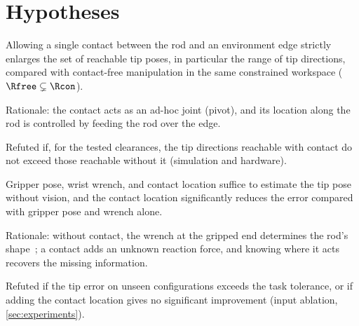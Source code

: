 \section{Hypotheses}
\label{sec:hypotheses}


\begin{hypothesis}[Reachability]\label{hyp:reach}
Allowing a single contact between the rod and an environment edge strictly
enlarges the set of reachable tip poses, in particular the range of tip
directions, compared with contact-free manipulation in the same constrained
workspace ($\Rfree\subsetneq\Rcon$).
\end{hypothesis}
\begin{outline}
  \item Rationale: the contact acts as an ad-hoc joint (pivot), and its
    location along the rod is controlled by feeding the rod over the edge.
  \item Refuted if, for the tested clearances, the tip directions reachable
    with contact do not exceed those reachable without it (simulation and
    hardware).
\end{outline}

\begin{hypothesis}\label{hyp:estimate}
Gripper pose, wrist wrench, and contact location suffice to estimate the tip
pose without vision, and the contact location significantly reduces the error
compared with gripper pose and wrench alone.
\end{hypothesis}
\begin{outline}
  \item Rationale: without contact, the wrench at the gripped end determines
    the rod's shape~\cite{bretl2014quasistatic,mishani2022realtime}; a contact
    adds an unknown reaction force, and knowing where it acts recovers the
    missing information.
  \item Refuted if the tip error on unseen configurations exceeds the task
    tolerance, or if adding the contact location gives no significant
    improvement (input ablation, \cref{sec:experiments}).
\end{outline}

